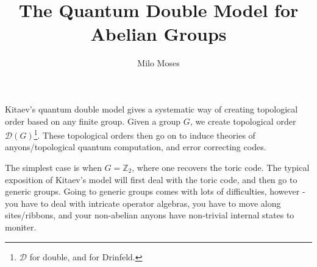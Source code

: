 \documentclass{article}
\title{The Quantum Double Model for Abelian Groups}
\author{Milo Moses}
\theoremstyle{definition}
\numberwithin{figure}{section}
\begin{document}
\maketitle

\newcommand{\RR}{\mathbb{R}}
\newcommand{\HH}{\mathbb{H}}
\newcommand{\NN}{\mathbb{N}}
\newcommand{\QQ}{\mathbb{Q}}
\newcommand{\DD}{\mathcal{D}}
\newcommand{\CC}{\mathbb{C}}
\newcommand{\FF}{\mathbb{F}}
\newcommand{\ZZ}{\mathbb{Z}}
\newcommand{\Zcal}{\mathcal{Z}}
\newcommand{\Ncal}{\mathcal{N}}
\newcommand{\LL}{\mathscr{L}}
\newcommand{\TT}{\mathcal{T}}
\newcommand{\Ccat}{\mathscr{C}}
\newcommand{\Dcat}{\mathscr{D}}
\newcommand{\Ecat}{\mathscr{E}}
\newcommand{\st}{\,\,\mathrm{s.t.}\,\,}
\newcommand{\mm}{\mathfrak{m}}
\newcommand{\pp}{\mathfrak{p}}
\newcommand{\Hom}{\mathrm{Hom}}
\newcommand{\Aut}{\mathrm{Aut}}
\newcommand{\Frac}{\mathrm{Frac}}
\newcommand{\tr}{\mathrm{tr}}
\newcommand{\op}{\mathrm{op}}
\newcommand{\res}{\mathrm{res}}
\newcommand{\im}{\mathrm{im}}
\newcommand{\ev}{\mathrm{ev}}
\newcommand{\coev}{\mathrm{coev}}
\newcommand{\id}{\mathrm{id}}
\newcommand{\coker}{\mathrm{coker}}
\newcommand{\SL}{\mathrm{SL}}
\newcommand{\End}{\mathrm{End}}
\newcommand{\Rep}{\bold{Rep}}
\newcommand{\Set}{\bold{Set}}
\newcommand{\Vecc}{\bold{Vec}}
\newcommand{\Top}{\bold{Top}}
\newcommand{\Grp}{\bold{Grp}}
\newcommand{\Hilb}{\bold{Hilb}}
\newcommand{\Bord}{\bold{Bord}}
\newcommand{\Cat}{\bold{Cat}}
\newcommand{\0}{\left|0\right>}
\newcommand{\1}{\left|1\right>}
\newcommand{\nullclass}{\left|\bold{0}\right>}
\newcommand{\alphaclass}{\left|\alpha\right>}
\newcommand{\betaclass}{\left|\beta\right>}
\newcommand{\alphabetaclass}{\left|\alpha\beta\right>}
\newcommand{\ppsi}{\left|\psi\right>}
\newcommand{\pphi}{\left|\phi\right>}
\newcommand{\func}{\mathrm{func}}
\newcommand{\bigleadsto}{\mathlarger{\mathlarger{\mathlarger{\leadsto}}}}
\newcommand{\vin}{\rotatebox[origin=c]{-90}{$\in$}}

Kitaev's quantum double model gives a systematic way of creating topological order based on any finite group. Given a group $G$, we create topological order $\DD(G)$\footnote{$\DD$ for double, and for Drinfeld.}. These topological orders then go on to induce theories of anyons/topological quantum computation, and error correcting codes.

The simplest case is when $G=\ZZ_2$, where one recovers the toric code. The typical exposition of Kitaev's model will first deal with the toric code, and then go to generic groups. Going to generic groups comes with lots of difficulties, however - you have to deal with intricate operator algebras, you have to move along sites/ribbons, and your non-abelian anyons have non-trivial internal states to moniter.
\end{document}
